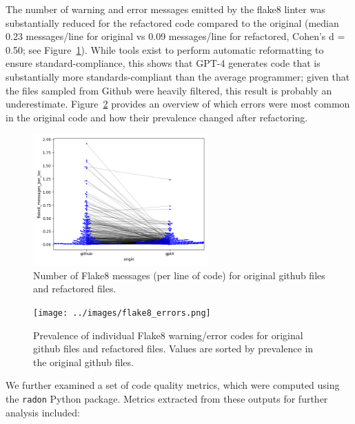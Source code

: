 \documentclass[
]{article}
\begin{document}
The number of warning and error messages emitted by the flake8 linter
was substantially reduced for the refactored code compared to the
original (median 0.23 messages/line for original vs 0.09 messages/line
for refactored, Cohen's d = 0.50; see Figure~\ref{fig-messages-plot}).
While tools exist to perform automatic reformatting to ensure
standard-compliance, this shows that GPT-4 generates code that is
substantially more standards-compliant than the average programmer;
given that the files sampled from Github were heavily filtered, this
result is probably an underestimate. Figure~\ref{fig-errors-plot}
provides an overview of which errors were most common in the original
code and how their prevalence changed after refactoring.

\begin{figure}

{\centering \includegraphics[width=0.6\textwidth,height=\textheight]{../images/flake8_messages_per_loc_swarmplot.png}

}

\caption{\label{fig-messages-plot}Number of Flake8 messages (per line of
code) for original github files and refactored files.}

\end{figure}

\begin{figure}

{\centering \texttt{[image: ../images/flake8\_errors.png]}

}

\caption{\label{fig-errors-plot}Prevalence of individual Flake8
warning/error codes for original github files and refactored files.
Values are sorted by prevalence in the original github files.}

\end{figure}

We further examined a set of code quality metrics, which were computed
using the \texttt{radon} Python package. Metrics extracted from these
outputs for further analysis included:
\end{document}
